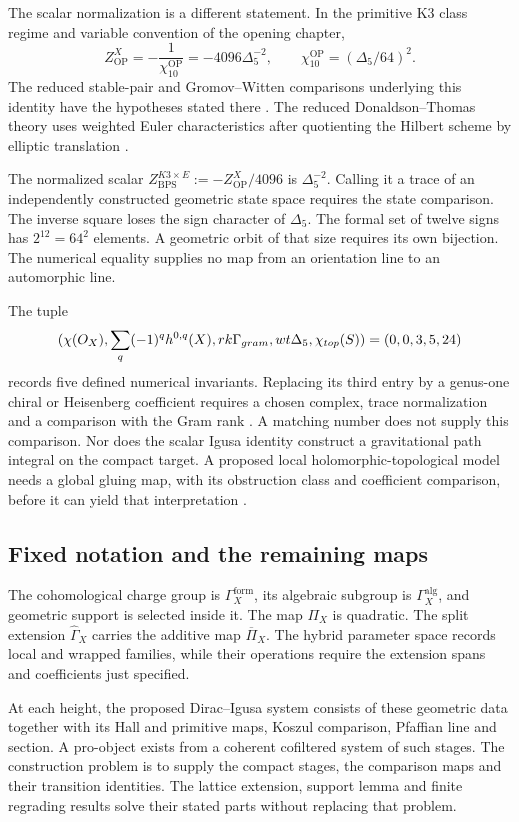 The scalar normalization is a different statement.  In the primitive
K3 class regime and variable convention of the opening chapter,
\[
Z^X_{\mathrm{OP}}=-\frac1{\chi_{10}^{\mathrm{OP}}}
=-4096\Delta_5^{-2},\qquad
\chi_{10}^{\mathrm{OP}}=(\Delta_5/64)^2.
\]
The reduced stable-pair and Gromov--Witten comparisons underlying
this identity have the hypotheses stated there
\cite{OberdieckReducedPT,OPand,OB}.
The reduced Donaldson--Thomas theory uses weighted Euler
characteristics after quotienting the Hilbert scheme by elliptic
translation \cite{BRYAN}.

The normalized scalar
$Z_{\mathrm{BPS}}^{K3\times E}:=-Z^X_{\mathrm{OP}}/4096$
is $\Delta_5^{-2}$.  Calling it a trace of an independently
constructed geometric state space requires the state comparison.
The inverse square loses the sign character of $\Delta_5$.
The formal set of twelve signs has $2^{12}=64^2$ elements.
A geometric orbit of that size requires its own bijection.
The numerical equality supplies no map from an orientation line
to an automorphic line.

\begin{remark}
\label{rem:kappa-tuple-compatibility}
The tuple
\[
(\chi(O_X),\sum_q(-1)^qh^{0,q}(X),
rk\Gamma_{gram},wt\Delta_5,
\chi_{top}(S))=(0,0,3,5,24)
\]
records five defined numerical invariants.  Replacing its third entry
by a genus-one chiral or Heisenberg coefficient requires a chosen
complex, trace normalization and a comparison with the Gram rank
\cite{CYQGVolIII}.
A matching number does not supply this comparison.  Nor does the
scalar Igusa identity construct a gravitational path integral on
the compact target.  A proposed local holomorphic-topological model
needs a global gluing map, with its obstruction class and coefficient
comparison, before it can yield that interpretation
\cite{MixedHTSCompanion}.
\end{remark}

\subsection{Fixed notation and the remaining maps}
\label{sec:k3xe-notation-summary}

The cohomological charge group is $\Gamma_X^{\mathrm{form}}$, its
algebraic subgroup is $\Gamma_X^{\mathrm{alg}}$, and geometric support
is selected inside it.  The map $\Pi_X$ is quadratic.
The split extension $\widehat\Gamma_X$ carries the additive map
$\overline\Pi_X$.  The hybrid parameter space records local and
wrapped families, while their operations require the extension spans
and coefficients just specified.

At each height, the proposed Dirac--Igusa system consists of these
geometric data together with its Hall and primitive maps, Koszul
comparison, Pfaffian line and section.  A pro-object exists from a
coherent cofiltered system of such stages.  The construction problem
is to supply the compact stages, the comparison maps and their
transition identities.  The lattice extension, support lemma and
finite regrading results solve their stated parts without replacing
that problem.
